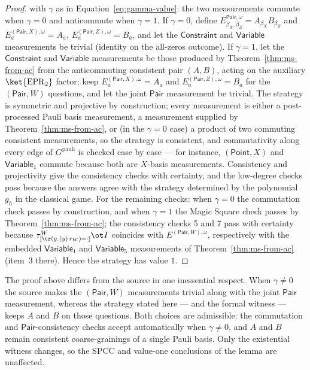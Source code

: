 \begin{proof}
	with $\gamma$ as in Equation~\eqref{eq:gamma-value}: the two measurements commute when $\gamma = 0$ and anticommute when $\gamma = 1$. If $\gamma = 0$, define $E^{\mathsf{Pair},\omega}_{\beta_X,\beta_Z} = A_{\beta_X} B_{\beta_Z}$ and $E^{(\mathsf{Pair},X),\omega}_a = A_a$, $E^{(\mathsf{Pair},Z),\omega}_a = B_a$, and let the $\mathsf{Constraint}$ and $\mathsf{Variable}$ measurements be trivial (identity on the all-zeros outcome). If $\gamma = 1$, let the $\mathsf{Constraint}$ and $\mathsf{Variable}$ measurements be those produced by Theorem~\ref{thm:ms-from-ac} from the anticommuting consistent pair $(A, B)$, acting on the auxiliary $\ket{\mathrm{EPR}_2}$ factor; keep $E^{(\mathsf{Pair},X),\omega}_a = A_a$ and $E^{(\mathsf{Pair},Z),\omega}_a = B_a$ for the $(\mathsf{Pair},W)$ questions, and let the joint $\mathsf{Pair}$ measurement be trivial. The strategy is symmetric and projective by construction; every measurement is either a post-processed Pauli basis measurement, a measurement supplied by Theorem~\ref{thm:ms-from-ac}, or (in the $\gamma = 0$ case) a product of two commuting consistent measurements, so the strategy is consistent, and commutativity along every edge of $G^{\mathrm{pauli}}$ is checked case by case --- for instance, $(\mathsf{Point},X)$ and $\mathsf{Variable}_1$ commute because both are $X$-basis measurements. Consistency and projectivity give the consistency checks with certainty, and the low-degree checks pass because the answers agree with the strategy determined by the polynomial $g_h$ in the classical game. For the remaining checks: when $\gamma = 0$ the commutation check passes by construction, and when $\gamma = 1$ the Magic Square check passes by Theorem~\ref{thm:ms-from-ac}; the consistency checks 5 and 7 pass with certainty because $\tau^W_{[\tr(g_\cdot(y)\, r_W) = \cdot]} \ot I$ coincides with $E^{(\mathsf{Pair},W),\omega}$, respectively with the embedded $\mathsf{Variable}_1$ and $\mathsf{Variable}_5$ measurements of Theorem~\ref{thm:ms-from-ac} (item~3 there). Hence the strategy has value $1$.
\end{proof}

The proof above differs from the source in one inessential respect. When
$\gamma\neq 0$ the source makes the $(\mathsf{Pair},W)$ measurements trivial
along with the joint $\mathsf{Pair}$ measurement, whereas the strategy stated
here --- and the formal witness --- keeps $A$ and $B$ on those questions. Both
choices are admissible: the commutation and $\mathsf{Pair}$-consistency checks
accept automatically when $\gamma\neq 0$, and $A$ and $B$ remain consistent
coarse-grainings of a single Pauli basis. Only the existential witness changes,
so the SPCC and value-one conclusions of the lemma are unaffected.

